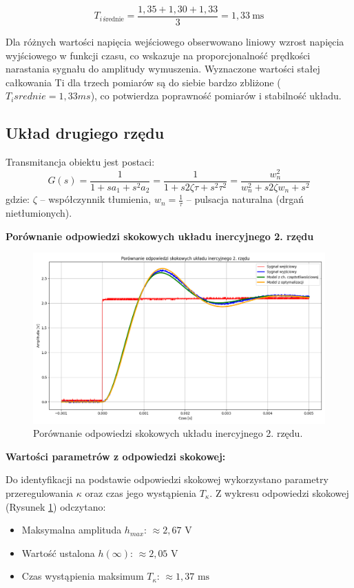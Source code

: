 \documentclass[12pt,a4paper]{article}
\begin{document}
	\[
	T_{i\,\text{średnie}} = \frac{1,35 + 1,30 + 1,33}{3} = 1,33\ \text{ms}
	\]
	
	Dla różnych wartości napięcia wejściowego obserwowano liniowy wzrost napięcia wyjściowego w funkcji czasu, co wskazuje na proporcjonalność prędkości narastania sygnału do amplitudy wymuszenia. Wyznaczone wartości stałej całkowania Ti dla trzech pomiarów są do siebie bardzo zbliżone ($T_isrednie = 1,33 ms$), co potwierdza poprawność pomiarów i stabilność układu.
	
	\subsection{Układ drugiego rzędu}
	Transmitancja obiektu jest postaci:
	\begin{equation}
		G(s) = \frac{1}{1 + sa_1 + s^2a_2}
		= \frac{1}{1+s 2\zeta \tau + s^2 \tau^2}
		= \frac{w_n^2}{w_n^2 + s 2 \zeta w_n + s^2}
	\end{equation}
	gdzie: \(\zeta\) – współczynnik tłumienia, \(w_n = \frac{1}{\tau}\) – pulsacja naturalna (drgań nietłumionych).
	
	\textbf{Porównanie odpowiedzi skokowych układu inercyjnego 2. rzędu}
	\begin{figure}[H]
		\centering
		\includegraphics[width=1\linewidth]{zdjecia/ukl2.png}
		\caption{Porównanie odpowiedzi skokowych układu inercyjnego 2. rzędu.}
		\label{fig:OdpSkokowa2}
	\end{figure}
	
	\textbf{Wartości parametrów z odpowiedzi skokowej:}
	
	Do identyfikacji na podstawie odpowiedzi skokowej wykorzystano parametry przeregulowania \(\kappa\) oraz czas jego wystąpienia \(T_{\kappa}\). Z wykresu odpowiedzi skokowej (Rysunek \ref{fig:OdpSkokowa2}) odczytano:
	\begin{itemize}
		\item Maksymalna amplituda \(h_{max}\): $\approx 2,67 \text{ V}$
		\item Wartość ustalona \(h(\infty)\): $\approx 2,05 \text{ V}$
		\item Czas wystąpienia maksimum \(T_{\kappa}\): $\approx 1,37 \text{ ms}$
	\end{itemize}
	
\end{document}

